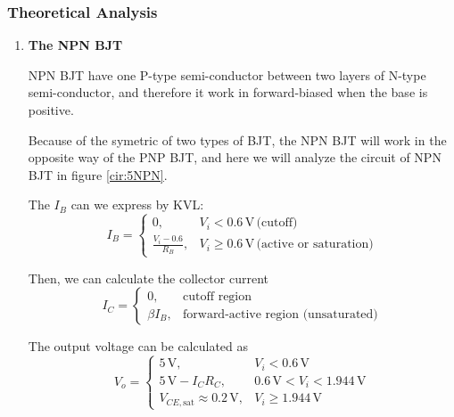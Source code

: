     \subsubsection{Theoretical Analysis}
        \begin{enumerate}[a]
            \item \textbf{The NPN BJT}\par
                NPN BJT have one P-type semi-conductor between two layers of N-type semi-conductor, and therefore it work in forward-biased when the base is positive.\par 
                Because of the symetric of two types of BJT, the NPN BJT will work in the opposite way of the PNP BJT, and here we will analyze the circuit of NPN BJT in figure \ref{cir:5NPN}.\par
        
                The $I_B$ can we express by KVL:
                \begin{equation}
                    I_B =
                        \begin{cases} 
                            0, & V_i < 0.6 \, \text{V} \, \text{(cutoff)} \\ 
                            \frac{V_i - 0.6}{R_B}, & V_i \geq 0.6 \, \text{V} \, \text{(active or saturation)}
                        \end{cases}
                \end{equation}
        
                Then, we can calculate the collector current
                \begin{equation}
                    I_C =
                    \begin{cases}
                        0, & \text{cutoff region} \\ 
                        \beta I_B, & \text{forward-active region (unsaturated)}
                    \end{cases}
                \end{equation}
        
                The output voltage can be calculated as 
                \begin{equation}
                    V_o =
                    \begin{cases}
                        5 \, \text{V}, & V_i < 0.6 \, \text{V} \\ 
                        5 \, \text{V} - I_C R_C, & 0.6 \, \text{V} < V_i < 1.944 \, \text{V} \\ 
                        V_{CE,\text{sat}} \approx 0.2 \, \text{V}, & V_i \geq 1.944 \, \text{V}
                    \end{cases}
                \end{equation}
        

\end{enumerate}
